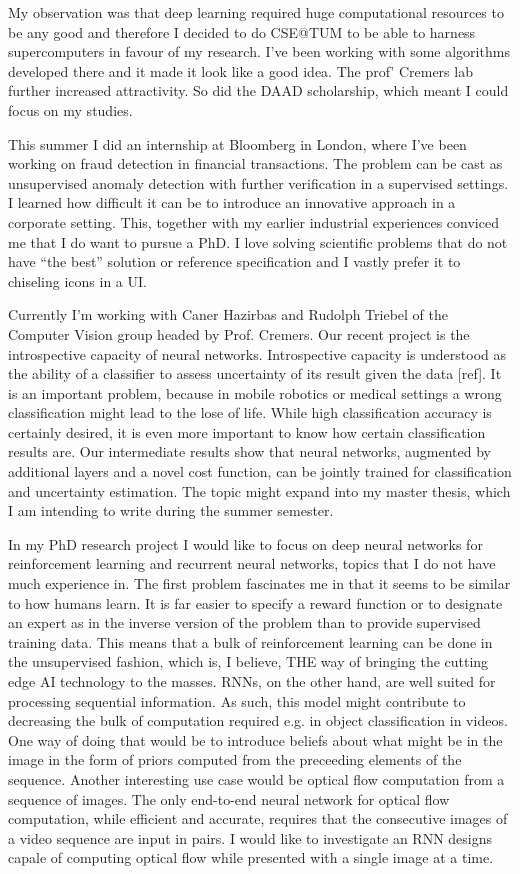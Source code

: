 \documentclass[12pt]{article}
\begin{document}
My observation was that deep learning required huge computational resources to be any good and therefore I decided to do CSE@TUM to be able to harness supercomputers in favour of my research. I've been working with some algorithms developed there and it made it look like a good idea. The prof' Cremers lab further increased attractivity. So did the DAAD scholarship, which meant I could focus on my studies. 

This summer I did an internship at Bloomberg in London, where I've been working on fraud detection in financial transactions. The problem can be cast as unsupervised anomaly detection with further verification in a supervised settings. I learned how difficult it can be to introduce an innovative approach in a corporate setting. This, together with my earlier industrial experiences conviced me that I do want to pursue a PhD. I love solving scientific problems that do not have “the best” solution or reference specification and I vastly prefer it to chiseling icons in a UI. 

Currently I'm working with Caner Hazirbas and Rudolph Triebel of the Computer Vision group headed by Prof. Cremers. Our recent project is the introspective capacity of neural networks. Introspective capacity is understood as the ability of a classifier to assess uncertainty of its result given the data [ref]. It is an important problem, because in mobile robotics or medical settings a wrong classification might lead to the lose of life. While high classification accuracy is certainly desired, it is even more important to know how certain classification results are. Our intermediate results show that neural networks, augmented by additional layers and a novel cost function, can be jointly trained for classification and uncertainty estimation. The topic might expand into my master thesis, which I am intending to write during the summer semester.

In my PhD research project I would like to focus on deep neural networks for reinforcement learning and recurrent neural networks, topics that I do not have much experience in. The first problem fascinates me in that it seems to be similar to how humans learn. It is far easier to specify a reward function or to designate an expert as in the inverse version of the problem than to provide supervised training data. This means that a bulk of reinforcement learning can be done in the unsupervised fashion, which is, I believe, THE way of bringing the cutting edge AI technology to the masses. RNNs, on the other hand, are well suited for processing sequential information. As such, this model might contribute to decreasing the bulk of computation required e.g. in object classification in videos. One way of doing that would be to introduce beliefs about what might be in the image in the form of priors computed from the preceeding elements of the sequence. Another interesting use case would be optical flow computation from a sequence of images. The only end-to-end neural network for optical flow computation, while efficient and accurate, requires that the consecutive images of a video sequence are input in pairs. I would like to investigate an RNN designs capale of computing optical flow while presented with a single image at a time.
\end{document}
